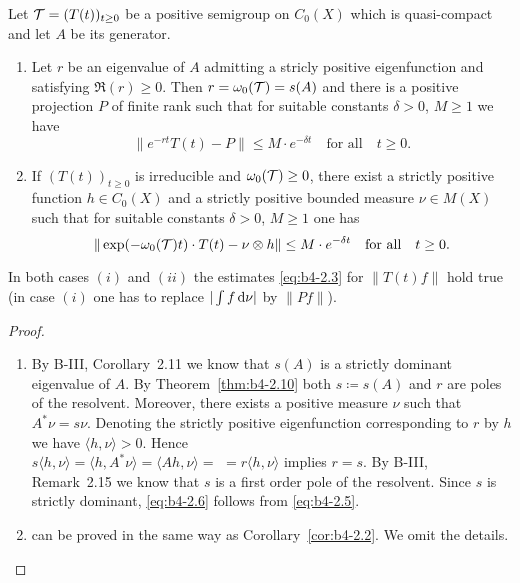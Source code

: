 \begin{corollary}\label{cor:b4-2.11}
Let $\mathcal{T} = (T(t))_{t \geq 0}$ be a positive semigroup on $C_{0}(X)$ which is quasi-compact and let $A$ be its generator.
\begin{enumerate}[\upshape (i)]
	\item	
	Let $r$ be an eigenvalue of $A$ admitting a stricly positive eigenfunction and satisfying $\Re(r) \geq 0$. 
    Then $r = \omega_{0}(\mathcal{T}) = s(A)$ and there is a positive projection $P$ of finite rank such that for suitable constants $\delta > 0$, $M \geq 1$ we have
	\begin{equation}\label{eq:b4-2.6}
		\|e^{-rt}T(t) - P\| \leq M \cdot e^{-\delta t} \quad \text{for all} \quad t \geq 0 \text{.}
	\end{equation}
	
	\item 
	If $(T(t))_{t \geq 0}$ is irreducible and $\omega_{0}(\mathcal{T}) \geq 0$, there exist a strictly positive function $h \in C_{0}(X)$ and a strictly positive bounded measure $\nu \in M(X)$ such that for suitable constants $\delta > 0$, $M \geq 1$ one has
	\begin{equation}\label{eq:b4-2.7}
		\|\exp(-\omega_{0}(\mathcal{T})t) \cdot T(t) - \nu \otimes h\| \leq M \cdot e^{-\delta t} \quad \text{for all} \quad t \geq 0 \text{.}
	\end{equation}
\end{enumerate}
In both cases $(i)$ and $(ii)$ the estimates \eqref{eq:b4-2.3} for $\|T(t)f\|$ hold true (in case $(i)$ one has to replace $|\int f \mathop{}\!\mathrm{d}{\nu}|$ by $\|Pf\|$).
\end{corollary}
\begin{proof}
	\begin{enumerate}[\upshape (i), wide, labelsep=1em, itemsep=1ex]
		\item 
		By B-III, Corollary~2.11 we know that $s(A)$ is a strictly dominant eigenvalue of $A$. 
        By Theorem~\ref{thm:b4-2.10} both $s  \coloneq  s(A)$ and $r$ are poles of the resolvent. 
        Moreover, there exists a positive measure $\nu$ such that $A^*\nu = s\nu$. 
        Denoting the strictly positive eigenfunction corresponding to $r$ by $h$ we have $\langle h,\nu \rangle > 0$. 
        Hence 
        \\
        $s\langle h,\nu \rangle = \langle h,A^*\nu \rangle = \langle Ah,\nu \rangle =$ $= r\langle h,\nu \rangle$ implies $r = s$. By B-III, Remark~2.15 we know that $s$ is a first order pole of the resolvent. Since $s$ is strictly dominant, \eqref{eq:b4-2.6} follows from \eqref{eq:b4-2.5}.

		\item 
		can be proved in the same way as Corollary~\ref{cor:b4-2.2}. We omit the details.
	\end{enumerate}
\end{proof}

